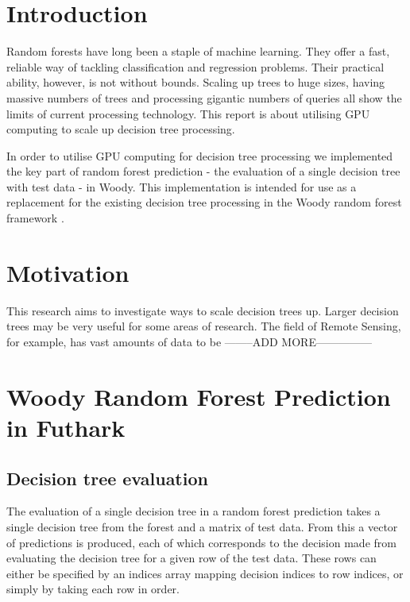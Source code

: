 \documentclass[a4paper]{article}
\begin{document}
\maketitle

\begin{abstract}
  
\end{abstract}

\section{Introduction}

Random forests have long been a staple of machine learning. They offer a fast, reliable way of tackling classification and regression problems. Their practical ability, however, is not without bounds. Scaling up trees to huge sizes, having massive numbers of trees and processing gigantic numbers of queries all show the limits of current processing technology. This report is about utilising GPU computing to scale up decision tree processing.

In order to utilise GPU computing for decision tree processing we implemented the key part of random forest prediction - the evaluation of a single decision tree with test data - in Woody. This implementation is intended for use as a replacement for the existing decision tree processing in the Woody random forest framework \cite{woody}.

\section{Motivation}

This research aims to investigate ways to scale decision trees up. Larger decision trees may be very useful for some areas of research. The field of Remote Sensing, for example, has vast amounts of data to be --------ADD MORE---------------

\section{Woody Random Forest Prediction in Futhark}

\subsection{Decision tree evaluation}

The evaluation of a single decision tree in a random forest prediction takes a single decision tree from the forest and a matrix of test data. From this a vector of predictions is produced, each of which corresponds to the decision made from evaluating the decision tree for a given row of the test data. These rows can either be specified by an indices array mapping decision indices to row indices, or simply by taking each row in order.
\end{document}
